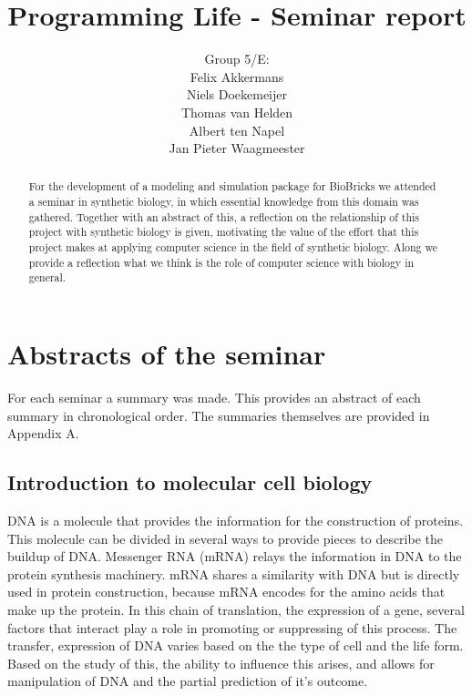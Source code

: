 \documentclass[a4paper]{article}
\title{Programming Life - Seminar report}
\author{Group 5/E:\\
Felix Akkermans \\
Niels Doekemeijer \\
Thomas van Helden \\
Albert ten Napel \\
Jan Pieter Waagmeester}
\begin{document}
\maketitle

\begin{abstract}
For the  development of a modeling and simulation package for BioBricks we attended a seminar in synthetic biology, in which essential knowledge from this domain was gathered. Together with an abstract of  this, a reflection on the relationship of this project with synthetic biology is given, motivating the value of the effort that this project makes at applying computer science in the field of synthetic biology. Along we provide a reflection what we think is the role of computer science with biology in general.\end{abstract}

\section{Abstracts of the seminar}
For each seminar a summary was made. This provides an abstract of each summary in chronological order. The summaries themselves are provided in Appendix A.

\subsection{Introduction to molecular cell biology}
DNA is a molecule that provides the information for the construction of proteins. This molecule can be divided in several ways to provide pieces to describe the buildup of DNA. Messenger RNA (mRNA) relays the information in DNA to the protein synthesis machinery. mRNA shares a similarity with DNA but is directly used in protein construction, because mRNA encodes for the amino acids that  make up the protein. In this chain of translation, the expression of a gene, several factors that interact play a role in promoting or suppressing of this process. The transfer, expression of DNA varies based on the the type of cell and the life form. Based on the study of this, the ability to influence this arises, and allows for manipulation of DNA and the partial prediction of it's outcome. 
\end{document}
